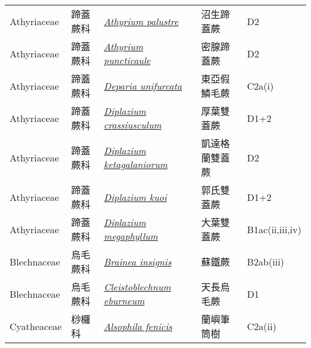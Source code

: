 {\begin{longtable}{p{2.5cm}p{2cm}p{5cm}p{2.5cm}p{3cm}}
    Athyriaceae & 蹄蓋蕨科 & \href{http://www.theplantlist.org/tpl1.1/search?q=Athyrium+palustre}{\textit{Athyrium palustre} } & 沼生蹄蓋蕨 & D2 \index{Athyrium@\textit{Athyrium}!palustre@\textit{palustre}}  \index{沼生蹄蓋蕨} \\
    Athyriaceae & 蹄蓋蕨科 & \href{http://www.theplantlist.org/tpl1.1/search?q=Athyrium+puncticaule}{\textit{Athyrium puncticaule} } & 密腺蹄蓋蕨 & D2 \index{Athyrium@\textit{Athyrium}!puncticaule@\textit{puncticaule}}  \index{密腺蹄蓋蕨} \\
    Athyriaceae & 蹄蓋蕨科 & \href{http://www.theplantlist.org/tpl1.1/search?q=Deparia+unifurcata}{\textit{Deparia unifurcata} } & 東亞假鱗毛蕨 & C2a(i) \index{Deparia@\textit{Deparia}!unifurcata@\textit{unifurcata}}  \index{東亞假鱗毛蕨} \\
    Athyriaceae & 蹄蓋蕨科 & \href{http://www.theplantlist.org/tpl1.1/search?q=Diplazium+crassiusculum}{\textit{Diplazium crassiusculum} } & 厚葉雙蓋蕨 & D1+2 \index{Diplazium@\textit{Diplazium}!crassiusculum@\textit{crassiusculum}}  \index{厚葉雙蓋蕨} \\
    Athyriaceae & 蹄蓋蕨科 & \href{http://www.theplantlist.org/tpl1.1/search?q=Diplazium+ketagalaniorum}{\textit{Diplazium ketagalaniorum} } & 凱達格蘭雙蓋蕨 & D2 \index{Diplazium@\textit{Diplazium}!ketagalaniorum@\textit{ketagalaniorum}}  \index{凱達格蘭雙蓋蕨} \\
    Athyriaceae & 蹄蓋蕨科 & \href{http://www.theplantlist.org/tpl1.1/search?q=Diplazium+kuoi}{\textit{Diplazium kuoi} } & 郭氏雙蓋蕨 & D1+2 \index{Diplazium@\textit{Diplazium}!kuoi@\textit{kuoi}}  \index{郭氏雙蓋蕨} \\
    Athyriaceae & 蹄蓋蕨科 & \href{http://www.theplantlist.org/tpl1.1/search?q=Diplazium+megaphyllum}{\textit{Diplazium megaphyllum} } & 大葉雙蓋蕨 & B1ac(ii,iii,iv) \index{Diplazium@\textit{Diplazium}!megaphyllum@\textit{megaphyllum}}  \index{大葉雙蓋蕨} \\
    Blechnaceae & 烏毛蕨科 & \href{http://www.theplantlist.org/tpl1.1/search?q=Brainea+insignis}{\textit{Brainea insignis} } & 蘇鐵蕨 & B2ab(iii) \index{Brainea@\textit{Brainea}!insignis@\textit{insignis}}  \index{蘇鐵蕨} \\
    Blechnaceae & 烏毛蕨科 & \href{http://www.theplantlist.org/tpl1.1/search?q=Cleistoblechnum+eburneum}{\textit{Cleistoblechnum eburneum} } & 天長烏毛蕨 & D1 \index{Cleistoblechnum@\textit{Cleistoblechnum}!eburneum@\textit{eburneum}}  \index{天長烏毛蕨} \\
    Cyatheaceae & 桫欏科 & \href{http://www.theplantlist.org/tpl1.1/search?q=Alsophila+fenicis}{\textit{Alsophila fenicis} } & 蘭嶼筆筒樹 & C2a(ii) \index{Alsophila@\textit{Alsophila}!fenicis@\textit{fenicis}}  \index{蘭嶼筆筒樹} \\

\end{longtable}}
